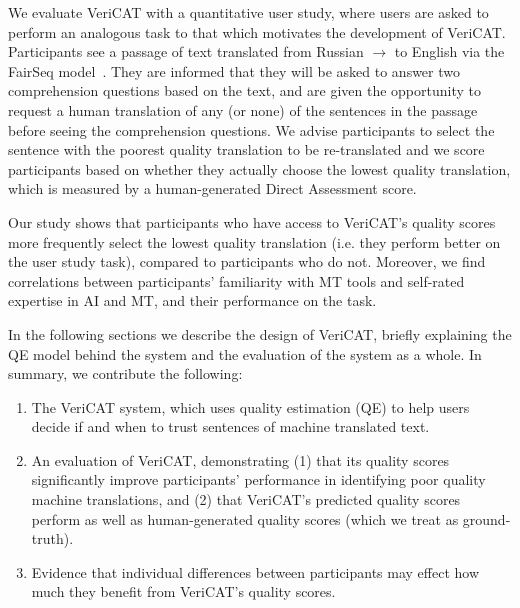 We evaluate VeriCAT with a quantitative user study, where users are asked to perform an analogous task to that which motivates the development of VeriCAT. Participants see a passage of text translated from Russian $\rightarrow$ to English via the FairSeq model~\cite{ott-etal-2019-fairseq}. They are informed that they will be asked to answer two comprehension questions based on the text, and are given the opportunity to request a human translation of any (or none) of the sentences in the passage before seeing the comprehension questions. We advise participants to select the sentence with the poorest quality translation to be re-translated and we score participants based on whether they actually choose the lowest quality translation, which is measured by a human-generated Direct Assessment score. %

Our study shows that participants who have access to VeriCAT's quality scores more frequently select the lowest quality translation (i.e. they perform better on the user study task), compared to participants who do not. Moreover, we find correlations between participants' familiarity with MT tools and self-rated expertise in AI and MT, and their performance on the task. 

In the following sections we describe the design of VeriCAT, briefly explaining the QE model behind the system and the evaluation of the system as a whole. In summary, we contribute the following: 

\begin{enumerate}
    \item The VeriCAT system, which uses quality estimation (QE) to help users decide if and when to trust sentences of machine translated text.   
    \item An evaluation of VeriCAT, demonstrating (1) that its quality scores significantly improve participants' performance in identifying poor quality machine translations, and (2) that VeriCAT's predicted quality scores perform as well as human-generated quality scores (which we treat as ground-truth). 
    \item Evidence that individual differences between participants may effect how much they benefit from VeriCAT's quality scores. 
\end{enumerate}
